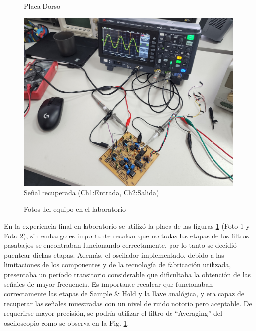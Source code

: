 \begin{figure}[H]
\begin{minipage}[b]{0.3\textwidth}
        \\[2pt] {\small Placa Dorso}
    \end{minipage}\hfill
    \begin{minipage}[b]{0.3\textwidth}
        \centering
        \includegraphics[width=\textwidth]{Imagenes/Medicion.jpg}
        \\[2pt] {\small Señal recuperada (Ch1:Entrada, Ch2:Salida)}
        \label{osciloscopio}
    \end{minipage}
    \caption{Fotos del equipo en el laboratorio}
    \label{fig:enElLabo}
\end{figure}
En la experiencia final en laboratorio se utilizó la placa de las figuras \ref{fig:enElLabo} (Foto 1 y Foto 2), 
sin embargo es importante recalcar que no todas las etapas de los filtros pasabajos se encontraban funcionando 
correctamente, por lo tanto se decidió puentear dichas etapas.
Además, el oscilador implementado, debido a las limitaciones de los componentes y de la tecnología de fabricación
utilizada, presentaba un período transitorio considerable que dificultaba la obtención de las señales de mayor frecuencia.
Es importante recalcar que funcionaban correctamente las etapas de Sample \& Hold y la llave analógica, y era capaz 
de recuperar las señales muestradas con un nivel de ruido notorio pero aceptable. De requerirse mayor precisión, se podría
utilizar el filtro de ``Averaging'' del osciloscopio como se observa en la Fig. \ref{fig:enElLabo}.